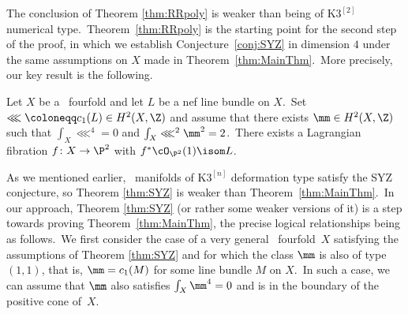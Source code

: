 The conclusion  of Theorem \ref{thm:RRpoly} is  weaker than being of ${\mathrm K3}^{[2]}$ numerical type.\
Theorem~\ref{thm:RRpoly} is the starting point for the  second step of the proof, in which we establish
 Conjecture~\ref{conj:SYZ} in dimension $4$  under the same  assumptions on $X$ made in Theorem~\ref{thm:MainThm}.\
More precisely, our key result is the following.

\begin{theo}\label{thm:SYZ}
Let $X$ be a \hk\ fourfold and let $L$ be  a nef line bundle on $X$.\ Set
$\lll\coloneqq c_1(L) \in H^2(X,\Z)$ and assume that there exists $\mm\in H^2(X,\Z)$ such that     $\int_X \lll^4=0$ and $\int_X\lll^2\mm^2=2$.\
There exists a Lagrangian fibration $f\colon X\to\P^2$ with $f^*{\cO_{\P^2}}(1)\isom L$.
\end{theo}
As we mentioned earlier, \hk\ manifolds  of $\mathrm{K3}^{[n]}$ deformation type satisfy the SYZ conjecture, so Theorem \ref{thm:SYZ} is weaker than Theorem~\ref{thm:MainThm}.\  In our approach, Theorem \ref{thm:SYZ} (or rather  some weaker versions of it) is a step towards
proving   Theorem~\ref{thm:MainThm}, the precise logical relationships being   as follows.\
We first consider the case  of a very general \hk\ fourfold~$X$   satisfying the   assumptions  of Theorem \ref{thm:SYZ} and for which the class $\mm$ is also of type~$(1,1)$, that is, $\mm=c_1(M)$ for some line bundle $M$ on $X$.\
In such a case, we can assume that $\mm$ also satisfies $\int_X \mm^4=0$ and is in the boundary of the positive cone of~$X$.

